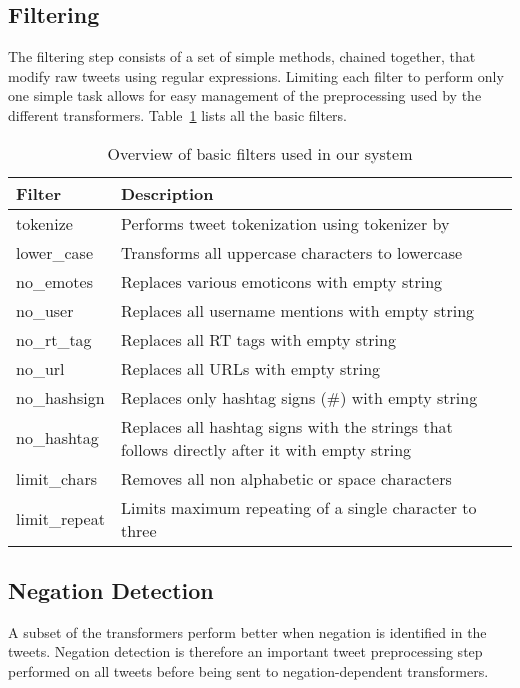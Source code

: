 \subsection*{Filtering}
The filtering step consists of a set of simple methods, chained together, that modify raw tweets using regular expressions. Limiting each filter to perform only one simple task allows for easy management of the preprocessing used by the different transformers. Table~\ref{tab:filters} lists all the basic filters.

\noindent\begin{table}[t]
    \begin{tabular}{| p{2.2cm} | p{9.3cm} |}
        \hline
        \textbf{Filter} & \textbf{Description} \\ \hline
        tokenize & Performs tweet tokenization using tokenizer by \cite{PottsTokenizer} \\ \hline
        lower\_case & Transforms all uppercase characters to lowercase \\ \hline
        no\_emotes & Replaces various emoticons with empty string \\ \hline
        no\_user & Replaces all username mentions with empty string \\ \hline
        no\_rt\_tag & Replaces all RT tags with empty string \\ \hline
        no\_url & Replaces all URLs with empty string \\ \hline
        no\_hashsign & Replaces only hashtag signs (\#) with empty string \\ \hline
        no\_hashtag & Replaces all hashtag signs with the strings that follows directly after it with empty string \\ \hline
        limit\_chars & Removes all non alphabetic or space characters \\ \hline
        limit\_repeat & Limits maximum repeating of a single character to three \\ \hline
    \end{tabular}
    \caption{Overview of basic filters used in our system}
    \label{tab:filters}
\end{table}

\subsection*{Negation Detection}
A subset of the transformers perform better when negation is identified in the tweets. Negation detection is therefore an important tweet preprocessing step performed on all tweets before being sent to negation-dependent transformers. \\

